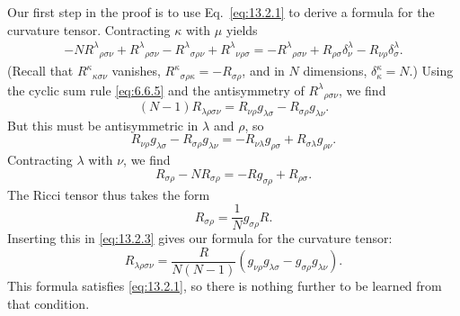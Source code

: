 Our first step in the proof is to use Eq.~\eqref{eq:13.2.1} to derive a
formula for the curvature tensor. Contracting \(\kappa\) with \(\mu\)
yields
\begin{align*}
  -N R^\lambda{}_{\rho\sigma\nu}
  +R^\lambda{}_{\rho\sigma\nu}
  -R^\lambda{}_{\sigma\rho\nu}
  +R^\lambda{}_{\nu\rho\sigma}
  =
  -R^\lambda{}_{\rho\sigma\nu}
  +R_{\rho\sigma}\delta_\nu^\lambda
  -R_{\nu\rho}\delta_\sigma^\lambda.
\end{align*}
(Recall that \(R^\kappa{}_{\kappa\sigma\nu}\) vanishes,
\(R^\kappa{}_{\sigma\rho\kappa}=-R_{\sigma\rho}\), and in \(N\)
dimensions, \(\delta_\kappa^\kappa=N\).) Using the cyclic sum rule
\eqref{eq:6.6.5} and the antisymmetry of
\(R^\lambda{}_{\rho\sigma\nu}\), we find
\begin{equation}
  (N-1)R_{\lambda\rho\sigma\nu}
  =
  R_{\nu\rho}g_{\lambda\sigma}
  -R_{\sigma\rho}g_{\lambda\nu}.
  \tag{13.2.3}\label{eq:13.2.3}
\end{equation}
But this must be antisymmetric in \(\lambda\) and \(\rho\), so
\[
  R_{\nu\rho}g_{\lambda\sigma}
  -R_{\sigma\rho}g_{\lambda\nu}
  =
  -R_{\nu\lambda}g_{\rho\sigma}
  +R_{\sigma\lambda}g_{\rho\nu}.
\]
Contracting \(\lambda\) with \(\nu\), we find
\[
  R_{\sigma\rho}-N R_{\sigma\rho}
  =
  -R g_{\sigma\rho}+R_{\rho\sigma}.
\]
The Ricci tensor thus takes the form
\begin{equation}
  R_{\sigma\rho}
  =
  \frac{1}{N}g_{\sigma\rho}R.
  \tag{13.2.4}\label{eq:13.2.4}
\end{equation}
Inserting this in \eqref{eq:13.2.3} gives our formula for the curvature
tensor:
\begin{equation}
  R_{\lambda\rho\sigma\nu}
  =
  \frac{R}{N(N-1)}
  \left(
    g_{\nu\rho}g_{\lambda\sigma}
    -g_{\sigma\rho}g_{\lambda\nu}
  \right).
  \tag{13.2.5}\label{eq:13.2.5}
\end{equation}
This formula satisfies \eqref{eq:13.2.1}, so there is nothing further to be
learned from that condition.

